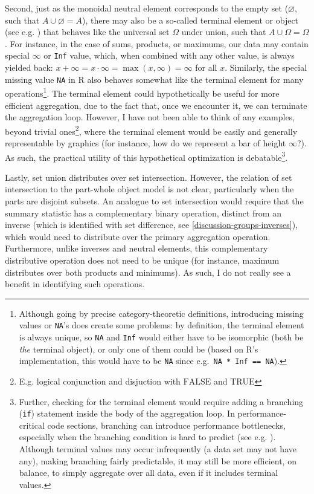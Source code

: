 \documentclass[
  openany]{book}
\theoremstyle{definition}
\theoremstyle{definition}
\theoremstyle{definition}
\theoremstyle{definition}
\theoremstyle{remark}
\begin{document}
Second, just as the monoidal neutral element corresponds to the empty set (\(\varnothing\), such that \(A \cup \varnothing = A\)), there may also be a so-called terminal element or object (see e.g. ) that behaves like the universal set \(\Omega\) under union, such that \(A \cup \Omega = \Omega\). For instance, in the case of sums, products, or maximums, our data may contain special \(\infty\) or \texttt{Inf} value, which, when combined with any other value, is always yielded back: \(x + \infty = x \cdot \infty = \max(x, \infty) = \infty\) for all \(x\). Similarly, the special missing value \texttt{NA} in R also behaves somewhat like the terminal element for many operations\footnote{Although going by precise category-theoretic definitions, introducing missing values or \texttt{NA}'s does create some problems: by definition, the terminal element is always unique, so \texttt{NA} and \texttt{Inf} would either have to be isomorphic (both be \emph{the} terminal object), or only one of them could be (based on R's implementation, this would have to be \texttt{NA} since e.g.~\texttt{NA\ *\ Inf\ ==\ NA}).}. The terminal element could hypothetically be useful for more efficient aggregation, due to the fact that, once we encounter it, we can terminate the aggregation loop. However, I have not been able to think of any examples, beyond trivial ones\footnote{E.g. logical conjunction and disjuction with \(\text{FALSE}\) and \(\text{TRUE}\)}, where the terminal element would be easily and generally representable by graphics (for instance, how do we represent a bar of height \(\infty\)?). As such, the practical utility of this hypothetical optimization is debatable\footnote{Further, checking for the terminal element would require adding a branching (\texttt{if}) statement inside the body of the aggregation loop. In performance-critical code sections, branching can introduce performance bottlenecks, especially when the branching condition is hard to predict (see e.g. ). Although terminal values may occur infrequently (a data set may not have any), making branching fairly predictable, it may still be more efficient, on balance, to simply aggregate over all data, even if it includes terminal values.}.

Lastly, set union distributes over set intersection. However, the relation of set intersection to the part-whole object model is not clear, particularly when the parts are disjoint subsets. An analogue to set intersection would require that the summary statistic has a complementary binary operation, distinct from an inverse (which is identified with set difference, see \ref{discussion-groups-inverses}), which would need to distribute over the primary aggregation operation. Furthermore, unlike inverses and neutral elements, this complementary distributive operation does not need to be unique (for instance, maximum distributes over both products and minimums). As such, I do not really see a benefit in identifying such operations.
\end{document}
